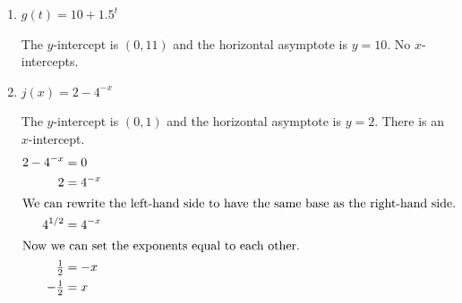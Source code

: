 \documentclass{article}
\begin{document}
\begin{enumerate}[resume, topsep=0pt]
\begin{enumerate}
\begin{solution}
    \end{solution}

  \item
    \begin{problem}[\vfill]
      $g(t) = 10 + 1.5^t$
    \end{problem}

    \begin{solution}
    The $y$-intercept is $(0, 11)$ and the horizontal asymptote is $y=10$. No $x$-intercepts.
    
    \end{solution}

  \item
    \begin{problem}[\vfill]
      $j(x) = 2 - 4^{-x}$
    \end{problem}

    \begin{solution}
    The $y$-intercept is $(0, 1)$ and the horizontal asymptote is $y=2$. There
    is an $x$-intercept.
    \begin{align*}
     2-4^{-x} &= 0 \\
     2 &= 4^{-x} \\
     \intertext{We can rewrite the left-hand side to have
     the same base as the right-hand side.}
     4^{1/2} &= 4^{-x} \\
     \intertext{Now we can set the exponents equal to each other.}
     \tfrac{1}{2} &= -x \\
     -\tfrac{1}{2} &= x
    \end{align*}
    
    \end{solution}

  \end{enumerate}
\end{enumerate}
\end{document}
